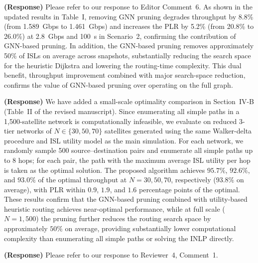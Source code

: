 \documentclass[letter]{article}
\begin{document}
\vspace{5mm}
{\bf (Response)}
Please refer to our response to Editor Comment~6. As shown in the updated results in Table~I, removing GNN pruning degrades throughput by 8.8\% (from 1.589~Gbps to 1.461~Gbps) and increases the PLR by 5.2\% (from 20.8\% to 26.0\%) at 2.8~Gbps and 100~s in Scenario~2, confirming the contribution of GNN-based pruning. In addition, the GNN-based pruning removes approximately 50\% of ISLs on average across snapshots, substantially reducing the search space for the heuristic Dijkstra and lowering the routing-time complexity. This dual benefit, throughput improvement combined with major search-space reduction, confirms the value of GNN-based pruning over operating on the full graph.

\vspace{10mm}
\noindent {}

\vspace{5mm}
{\bf (Response)}
We have added a small-scale optimality comparison in Section~IV-B (Table~II of the revised manuscript). Since enumerating all simple paths in a 1{,}500-satellite network is computationally infeasible, we evaluate on reduced 3-tier networks of $N \in \{30, 50, 70\}$ satellites generated using the same Walker-delta procedure and ISL utility model as the main simulation. For each network, we randomly sample 500 source--destination pairs and enumerate all simple paths up to 8 hops; for each pair, the path with the maximum average ISL utility per hop is taken as the optimal solution. The proposed algorithm achieves $95.7\%$, $92.6\%$, and $93.0\%$ of the optimal throughput at $N = 30, 50, 70$, respectively ($93.8\%$ on average), with PLR within $0.9$, $1.9$, and $1.6$ percentage points of the optimal. These results confirm that the GNN-based pruning combined with utility-based heuristic routing achieves near-optimal performance, while at full scale ($N=1{,}500$) the pruning further reduces the routing search space by approximately $50\%$ on average, providing substantially lower computational complexity than enumerating all simple paths or solving the INLP directly.

\vspace{10mm}
\noindent {}

\vspace{5mm}
{\bf (Response)}
Please refer to our response to Reviewer~4, Comment~1.
\end{document}
